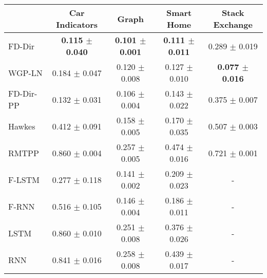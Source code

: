 \begin{tabular}{lcccc}
\toprule
{} &     Car Indicators &              Graph &         Smart Home &     Stack Exchange \\
\midrule
FD-Dir    &  \textbf{0.115 $\pm$ 0.040} &  \textbf{0.101 $\pm$ 0.001} &  \textbf{0.111 $\pm$ 0.011} &  0.289 $\pm$ 0.019 \\
WGP-LN    &  0.184 $\pm$ 0.047 &  0.120 $\pm$ 0.008 &  0.127 $\pm$ 0.010 &  \textbf{0.077 $\pm$ 0.016} \\
FD-Dir-PP &  0.132 $\pm$ 0.031 &  0.106 $\pm$ 0.004 &  0.143 $\pm$ 0.022 &  0.375 $\pm$ 0.007 \\
\midrule
Hawkes    &  0.412 $\pm$ 0.091 &  0.158 $\pm$ 0.005 &  0.170 $\pm$ 0.035 &  0.507 $\pm$ 0.003 \\
RMTPP     &  0.860 $\pm$ 0.004 &  0.257 $\pm$ 0.005 &  0.474 $\pm$ 0.016 &  0.721 $\pm$ 0.001 \\
F-LSTM    &  0.277 $\pm$ 0.118 &  0.141 $\pm$ 0.002 &  0.209 $\pm$ 0.023 &                  - \\
F-RNN     &  0.516 $\pm$ 0.105 &  0.146 $\pm$ 0.004 &  0.186 $\pm$ 0.011 &                  - \\
LSTM      &  0.860 $\pm$ 0.010 &  0.251 $\pm$ 0.008 &  0.376 $\pm$ 0.026 &                  - \\
RNN       &  0.841 $\pm$ 0.016 &  0.258 $\pm$ 0.008 &  0.439 $\pm$ 0.017 &                  - \\
\bottomrule
\end{tabular}
